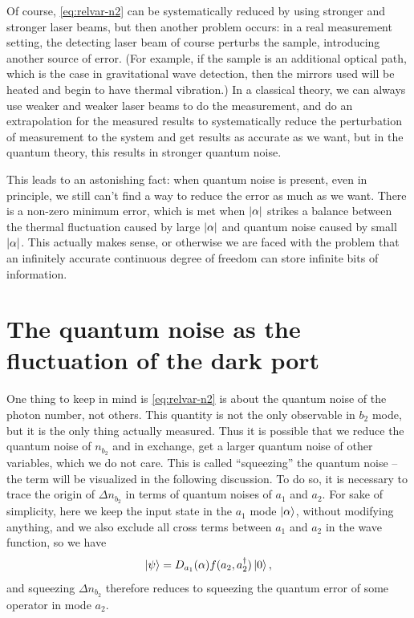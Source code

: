 \documentclass[hyperref, a4paper]{article}
\begin{document}
Of course, \eqref{eq:relvar-n2} can be systematically reduced by using stronger and stronger laser beams,
but then another problem occurs:
in a real measurement setting,
the detecting laser beam of course perturbs the sample,
introducing another source of error.
(For example, if the sample is an additional optical path,
which is the case in gravitational wave detection,
then the mirrors used will be heated
and begin to have thermal vibration.)
In a classical theory,
we can always use weaker and weaker laser beams to do the measurement,
and do an extrapolation for the measured results
to systematically reduce the perturbation of measurement to the system
and get results as accurate as we want,
but in the quantum theory,
this results in stronger quantum noise.

This leads to an astonishing fact:
when quantum noise is present, 
even in principle, 
we still can't find a way to reduce the error as much as we want.
There is a non-zero minimum error,
which is met when $\abs{\alpha}$ strikes a balance 
between the thermal fluctuation caused by large $\abs{\alpha}$
and quantum noise caused by small $\abs{\alpha}$.
This actually makes sense,
or otherwise we are faced with the problem 
that an infinitely accurate continuous degree of freedom can store infinite bits of information.

\section{The quantum noise as the fluctuation of the dark port}\label{sec:dark-port-analysis}

One thing to keep in mind is \eqref{eq:relvar-n2} 
is about the quantum noise of the photon number, not others.
This quantity is not the only observable in $b_2$ mode,
but it is the only thing actually measured.
Thus it is possible that we reduce the quantum noise of $n_{b_2}$
and in exchange, get a larger quantum noise of other variables,
which we do not care.
This is called ``squeezing'' the quantum noise
-- the term will be visualized in the following discussion.
To do so, it is necessary to trace the origin of $\Delta{n_{b_2}}$ 
in terms of quantum noises of $a_1$ and $a_2$. 
For sake of simplicity,
here we keep the input state in the $a_1$ mode $\ket{\alpha}$,
without modifying anything,
and we also exclude all cross terms between $a_1$ and $a_2$ in the wave function, 
so we have 
\begin{equation}
    \ket{\psi} = D_{a_1}(\alpha) f(a_2, a_2^\dagger) \ket{0},
    \label{eq:coherent-plus-squeeze}
\end{equation}
and squeezing $\Delta{n_{b_2}}$ therefore reduces to squeezing the quantum error of some operator in mode $a_2$.
\end{document}
